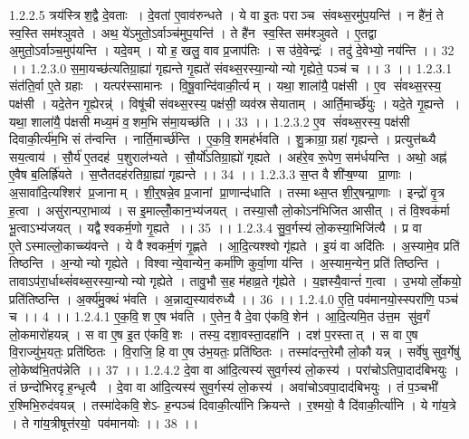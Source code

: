 1.2.2.5
त्रय॑स्त्रिश॒द्वै दे॒वताः । दे॒वता॑ ए॒वाव॑रुन्धते । ये वा इ॒तः पराञ्च संवथ्स॒रमु॑प॒यन्ति॑ । न है॑नं॒ ते स्व॒स्ति सम॑श्ञुवते । अथ॒ ये॑ऽमुतो॒ऽर्वाञ्च॑मुप॒यन्ति॑ । ते है॑न स्व॒स्ति सम॑श्ञुवते । ए॒तद्वा अ॒मुतो॒ऽर्वाञ्च॒मुप॑यन्ति । यदे॒वम् । यो ह॒ खलु॒ वाव प्र॒जाप॑तिः । स उ॑वे॒वेन्द्रः॑ । तदु॑ दे॒वेभ्यो॒ नय॑न्ति ।। 32 ।।
1.2.3.0
स॒मा॒यच्छ॑त्यतिग्रा॒ह्या॑ गृह्यन्ते गृ॒ह्यते॑ संवथ्स॒रस्या॒न्योन्यो गृह्येते॒ पञ्च॑ च ।। 3 ।।
1.2.3.1
संत॑ति॒र्वा ए॒ते ग्रहाः । यत्पर॑स्सामानः । वि॒षू॒वान्दि॑वाकी॒र्त्यम् । यथा॒ शाला॑यै॒ पक्ष॑सी । ए॒व सं॑वथ्स॒रस्य॒ पक्ष॑सी । यदे॒तेन गृ॒ह्येरन्न्॑ । विषू॑ची संवथ्स॒रस्य॒ पक्ष॑सी॒ व्यव॑स्रसेयाताम् । आर्ति॒मार्च्छे॑युः । यदे॒ते गृ॒ह्यन्ते । यथा॒ शाला॑यै॒ प॑क्षसी मध्य॒मं व॒॒शम॒भि स॑मा॒यच्छ॑ति ।। 33 ।।
1.2.3.2
ए॒व सं॑वथ्स॒रस्य॒ पक्ष॑सी दिवाकी॒र्त्य॑म॒भि सं त॑न्वन्ति । नार्ति॒मार्च्छ॑न्ति । ए॒क॒वि॒॒शमह॑र्भवति । शु॒क्राग्रा॒ ग्रहा॑ गृह्यन्ते । प्रत्युत्त॑ब्ध्यै सय॒त्वाय॑ । सौ॒र्य॑ ए॒तदह॑ प॒शुराल॑भ्यते । सौ॒र्यो॑ऽतिग्रा॒ह्यो॑ गृह्यते । अह॑रे॒व रू॒पेण॒ सम॑र्धयन्ति । अथो॒ अह्न॑ ए॒वैष ब॒लिर्ह्रि॑यते । स॒प्तैतदह॑रतिग्रा॒ह्या॑ गृह्यन्ते ।। 34 ।।
1.2.3.3
स॒प्त वै शी॑ऱ्ष॒ण्या प्रा॒णाः । अ॒सावा॑दि॒त्यश्शिर॑ प्र॒जानाम् । शी॒र्॒षन्ने॒व प्र॒जानां प्रा॒णान्द॑धाति । तस्माथ्स॒प्त शी॒र्॒षन्प्रा॒णाः । इन्द्रो॑ वृ॒त्र ह॒त्वा । असु॑रान्परा॒भाव्य॑ । स इ॒माल्लोँ॒कान॒भ्य॑जयत् । तस्या॒सौ लो॒कोऽन॑भिजित आसीत् । तं वि॒श्वक॑र्मा भू॒त्वाऽभ्य॑जयत् । यद्वैश्वकर्म॒णो गृ॒ह्यते ।। 35 ।।
1.2.3.4
सु॒व॒र्गस्य॑ लो॒कस्या॒भिजि॑त्यै । प्र वा ए॒तेऽस्माल्लो॒काच्च्य॑वन्ते । ये वैश्वकर्म॒णं गृ॒ह्णते । आ॒दि॒त्यश्श्वो गृ॑ह्यते । इ॒यं वा अदि॑तिः । अ॒स्यामे॒व प्रति॑ तिष्ठन्ति । अ॒न्योन्यो गृह्येते । विश्वान्ये॒वान्येन॒ कर्मा॑णि कुर्वा॒णा य॑न्ति । अ॒स्याम॒न्येन॒ प्रति॑ तिष्ठन्ति । तावाऽप॑रा॒र्धाथ्सं॑वथ्स॒रस्या॒न्योन्यो गृह्येते । तावु॒भौ स॒ह म॑हाव्र॒ते गृ॑ह्येते । य॒ज्ञस्यै॒वान्तं॑ ग॒त्वा । उ॒भयोर्लो॒कयो॒ प्रति॑तिष्ठन्ति । अ॒र्क्य॑मु॒क्थं भ॑वति । अ॒न्नाद्य॒स्याव॑रुध्यै ।। 36 ।।
1.2.4.0
ए॒ति॒ पव॑मानयो॒स्स्परा॑णि॒ पञ्च॑ च ।। 4 ।।
1.2.4.1
ए॒क॒वि॒॒श ए॒ष भ॑वति । ए॒तेन॒ वै दे॒वा ए॑कवि॒॒शेन॑ । आ॒दि॒त्यमि॒त उ॑त्त॒म सु॑व॒र्गं लो॒कमारो॑हयन्न् । स वा ए॒ष इ॒त ए॑कवि॒॒शः । तस्य॒ दशा॒वस्ता॒दहा॑नि । दश॑ प॒रस्तात् । स वा ए॒ष वि॒राज्यु॑भ॒यतः॒ प्रति॑ष्ठितः । वि॒राजि॒ हि वा ए॒ष उ॑भ॒यतः॒ प्रति॑ष्ठितः । तस्मा॑दन्त॒रेमौ लो॒कौ यन्न् । सर्वे॑षु सुव॒र्गेषु॑ लो॒केष्व॑भि॒तप॑न्नेति ।। 37 ।।
1.2.4.2
दे॒वा वा आ॑दि॒त्यस्य॑ सुव॒र्गस्य॑ लो॒कस्य॑ । परा॑चोऽतिपा॒दाद॑बिभयुः । तं छन्दो॑भिरदृह॒न्धृत्यै । दे॒वा वा आ॑दि॒त्यस्य॑ सुव॒र्गस्य॑ लो॒कस्य॑ । अवा॑चोऽवपा॒दाद॑बिभयुः । तं प॒ञ्चभी॑ र॒श्मिभि॒रुद॑वयन्न् । तस्मा॑देकवि॒॒शेऽ- ह॒न्पञ्च॑ दिवाकी॒र्त्या॑नि क्रियन्ते । र॒श्मयो॒ वै दि॑वाकी॒र्त्या॑नि । ये गा॑य॒त्रे । ते गा॑य॒त्रीषूत्त॑रयो॒ पव॑मानयोः ।। 38 ।।
